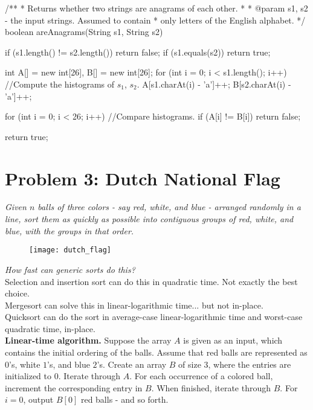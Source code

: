\begin{java}
    /**
     * Returns whether two strings are anagrams of each other.
     *
     * @param s1, s2 - the input strings. Assumed to contain
     *                 only letters of the English alphabet.
     */
    boolean areAnagrams(String s1, String s2) {
        if (s1.length() != s2.length()) {
            return false;
        }
        if (s1.equals(s2)) {
            return true;
        }

        int A[] = new int[26], B[] = new int[26];
        for (int i = 0; i < s1.length(); i++) { //Compute the histograms of $s_1$, $s_2$.
            A[s1.charAt(i) - 'a']++;
            B[s2.charAt(i) - 'a']++;
        }

        for (int i = 0; i < 26; i++) {          //Compare histograms.
            if (A[i] != B[i]) {
                return false;
            }
        }

        return true;
    }
\end{java}
\section*{Problem 3: Dutch National Flag}

\textit{Given $n$ balls of three colors - say red, white, and blue - arranged randomly in a line, sort them as quickly as possible into contiguous groups of red, white, and blue, with the groups in that order.}\\

\begin{figure}[h]
    \centering
    \texttt{[image: dutch\_flag]}
\end{figure}

\textit{How fast can generic sorts do this?}\\

Selection and insertion sort can do this in quadratic time. Not exactly the best choice.\\

Mergesort can solve this in linear-logarithmic time... but not in-place.\\

Quicksort can do the sort in average-case linear-logarithmic time and worst-case quadratic time, in-place.\\

\textbf{Linear-time algorithm.} Suppose the array $A$ is given as an input, which contains the initial ordering of the balls. Assume that red balls are represented as $0$'s, white $1$'s, and blue $2$'s. Create an array $B$ of size $3$, where the entries are initialized to $0$. Iterate through $A$. For each occurrence of a colored ball, increment the corresponding entry in $B$. When finished, iterate through $B$. For $i=0$, output $B[0]$ red balls - and so forth.\\

